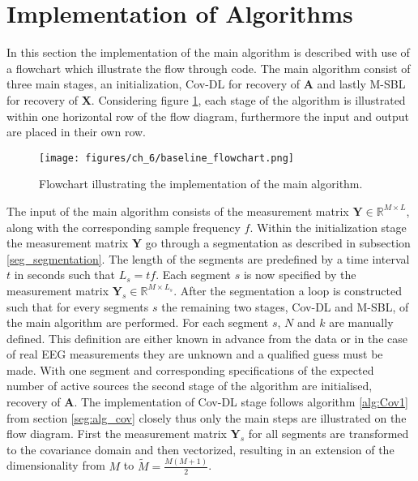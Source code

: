 \section{Implementation of Algorithms}\label{sec:implementation_flow}
In this section the implementation of the main algorithm is described with use of a flowchart which illustrate the flow through code.
The main algorithm consist of three main stages, an initialization, Cov-DL for recovery of $\mathbf{A}$ and lastly M-SBL for recovery of $\mathbf{X}$. 
Considering figure \ref{fig:flow}, each stage of the algorithm is illustrated within one horizontal row of the flow diagram, furthermore the input and output are placed in their own row.    
\begin{figure}[H]
\centering
\texttt{[image: figures/ch\_6/baseline\_flowchart.png]}
\caption{Flowchart illustrating the implementation of the main algorithm.}
\label{fig:flow}
\end{figure}
\noindent {}
The input of the main algorithm consists of the measurement matrix $\mathbf{Y} \in \mathbb{R}^{M \times L}$, along with the corresponding sample frequency $f$. 
Within the initialization stage the measurement matrix $\mathbf{Y}$ go through a segmentation as described in subsection \ref{seg_segmentation}. 
The length of the segments are predefined by a time interval $t$ in seconds such that $L_{s} = tf$. 
Each segment $s$ is now specified by the measurement matrix $\mathbf{Y}_s \in \mathbb{R}^{M \times L_{s}}$.
After the segmentation a loop is constructed such that for every segments $s$ the remaining two stages, Cov-DL and M-SBL, of the main algorithm are performed. 
For each segment $s$, $N$ and $k$ are manually defined. 
This definition are either known in advance from the data or in the case of real EEG measurements they are unknown and a qualified guess must be made.
With one segment and corresponding specifications of the expected number of active sources the second stage of the algorithm are initialised, recovery of $\mathbf{A}$.
The implementation of Cov-DL stage follows algorithm \ref{alg:Cov1} from section \ref{seg:alg_cov} closely thus only the main steps are illustrated on the flow diagram.
First the measurement matrix $\mathbf{Y}_s$ for all segments are transformed to the covariance domain and then vectorized, resulting in an extension of the dimensionality from $M$ to $\widetilde{M} = \frac{M(M+1)}{2}$.
